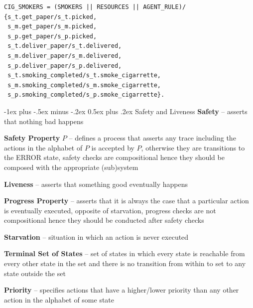 \documentclass[letterpaper, 8pt]{extarticle}
\makeatletter
\renewcommand{\section}{\@startsection{section}{1}{0mm}%
                                {-1ex plus -.5ex minus -.2ex}%
                                {0.5ex plus .2ex}%
                                {\normalfont\normalsize\bfseries}}
\makeatother
\begin{document}
\begin{multicols*}{5}
\begin{lstlisting}
CIG_SMOKERS = (SMOKERS || RESOURCES || AGENT_RULE)/
{s_t.get_paper/s_t.picked,
 s_m.get_paper/s_m.picked,
 s_p.get_paper/s_p.picked,
 s_t.deliver_paper/s_t.delivered,
 s_m.deliver_paper/s_m.delivered,
 s_p.deliver_paper/s_p.delivered,
 s_t.smoking_completed/s_t.smoke_cigarrette,
 s_m.smoking_completed/s_m.smoke_cigarrette,
 s_p.smoking_completed/s_p.smoke_cigarrette}.
\end{lstlisting}

  \section{Safety and Liveness}
  \textbf{Safety} -- asserts that nothing bad happens

  \textbf{Safety Property} $P$ -- defines a process that asserts any trace including the actions in the alphabet of $P$ is accepted by $P$, otherwise they are transitions to the ERROR state, safety checks are compositional hence they should be composed with the appropriate (sub)system

  \textbf{Liveness} -- asserts that something good eventually happens

  \textbf{Progress Property} -- asserts that it is always the case that a particular action is eventually executed, opposite of starvation, progress checks are not compositional hence they should be conducted after safety checks

  \textbf{Starvation} -- situation in which an action is never executed

  \textbf{Terminal Set of States} -- set of states in which every state is reachable from every other state in the set and there is no transition from within to set to any state outside the set

  \textbf{Priority} -- specifies actions that have a higher/lower priority than any other action in the alphabet of some state




\end{multicols*}
\end{document}
